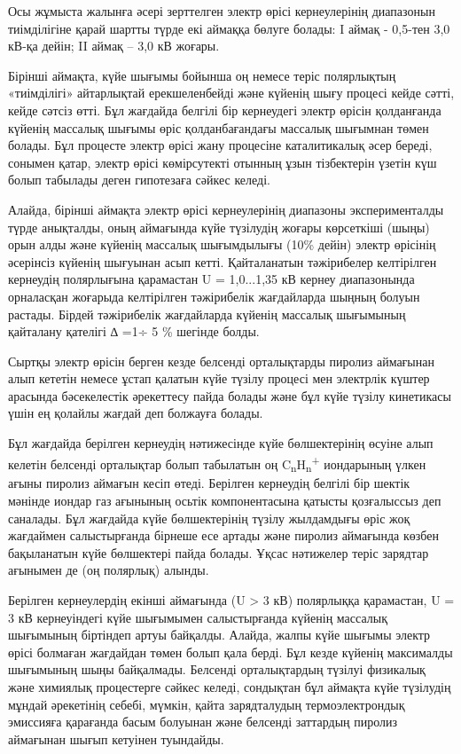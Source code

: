 \begin{multicols}{2}
Осы жұмыста жалынға әсері зерттелген электр өрісі кернеулерінің
диапазонын тиімділігіне қарай шартты түрде екі аймаққа бөлуге болады: I
аймақ - 0,5-тен 3,0 кВ-қа дейін; II аймақ -- 3,0 кВ жоғары.

Бірінші аймақта, күйе шығымы бойынша оң немесе теріс полярлықтың
«тиімділігі» айтарлықтай ерекшеленбейді және күйенің шығу процесі кейде
сәтті, кейде сәтсіз өтті. Бұл жағдайда белгілі бір кернеудегі электр
өрісін қолданғанда күйенің массалық шығымы өріс қолданбағандағы массалық
шығымнан төмен болады. Бұл процесте электр өрісі жану процесіне
каталитикалық әсер береді, сонымен қатар, электр өрісі көмірсутекті
отынның ұзын тізбектерін үзетін күш болып табылады деген гипотезаға
сәйкес келеді.

Алайда, бірінші аймақта электр өрісі кернеулерінің диапазоны
эксперименталды түрде анықталды, оның аймағында күйе түзілудің жоғары
көрсеткіші (шыңы) орын алды және күйенің массалық шығымдылығы (10\%
дейін) электр өрісінің әсерінсіз күйенің шығуынан асып кетті.
Қайталанатын тәжірибелер келтірілген кернеудің полярлығына қарамастан U
= 1,0...1,35 кВ кернеу диапазонында орналасқан жоғарыда келтірілген
тәжірибелік жағдайларда шыңның болуын растады. Бірдей тәжірибелік
жағдайларда күйенің массалық шығымының қайталану қателігі ∆ =1÷ 5 \%
шегінде болды.

Сыртқы электр өрісін берген кезде белсенді орталықтарды пиролиз
аймағынан алып кететін немесе ұстап қалатын күйе түзілу процесі мен
электрлік күштер арасында бәсекелестік әрекеттесу пайда болады және бұл
күйе түзілу кинетикасы үшін ең қолайлы жағдай деп болжауға болады.

Бұл жағдайда берілген кернеудің нәтижесінде күйе бөлшектерінің өсуіне
алып келетін белсенді орталықтар болып табылатын оң
C\textsubscript{n}H\textsubscript{n}\textsuperscript{+} иондарының үлкен
ағыны пиролиз аймағын кесіп өтеді. Берілген кернеудің белгілі бір шектік
мәнінде иондар газ ағынының осьтік компонентасына қатысты қозғалыссыз
деп саналады. Бұл жағдайда күйе бөлшектерінің түзілу жылдамдығы өріс жоқ
жағдаймен салыстырғанда бірнеше есе артады және пиролиз аймағында көзбен
бақыланатын күйе бөлшектері пайда болады. Ұқсас нәтижелер теріс зарядтар
ағынымен де (оң полярлық) алынды.

Берілген кернеулердің екінші аймағында (U \textgreater{} 3 кВ)
полярлыққа қарамастан, U = 3 кВ кернеуіндегі күйе шығымымен
салыстырғанда күйенің массалық шығымының біртіндеп артуы байқалды.
Алайда, жалпы күйе шығымы электр өрісі болмаған жағдайдан төмен болып
қала берді. Бұл кезде күйенің максималды шығымының шыңы байқалмады.
Белсенді орталықтардың түзілуі физикалық және химиялық процестерге
сәйкес келеді, сондықтан бұл аймақта күйе түзілудің мұндай әрекетінің
себебі, мүмкін, қайта зарядталудың термоэлектрондық эмиссияға қарағанда
басым болуынан және белсенді заттардың пиролиз аймағынан шығып кетуінен
туындайды.


\end{multicols}
